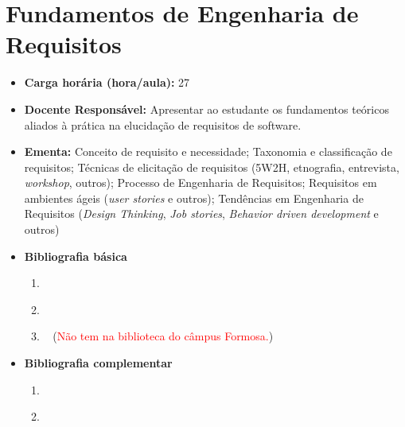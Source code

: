 \documentclass[11pt,fleqn]{book} %
\begin{document}
\newpage
\section{Fundamentos de Engenharia de Requisitos}\label{3_engreq}
\begin{itemize}
	\item \textbf{Carga horária (hora/aula):} 27
	\item \textbf{Docente Responsável:} Apresentar ao estudante os fundamentos teóricos aliados à prática na elucidação de requisitos de software.
	\item \textbf{Ementa:} 
	Conceito de requisito e necessidade;
	Taxonomia e classificação de requisitos;
	Técnicas de elicitação de requisitos (5W2H, etnografia, entrevista, \textit{workshop}, outros);
	Processo de Engenharia de Requisitos;
	Requisitos em ambientes ágeis (\textit{user stories} e outros);
	Tendências em Engenharia de Requisitos (\textit{Design Thinking}, \textit{Job stories}, \textit{Behavior driven development} e outros)
	\item \textbf{Bibliografia básica}
	\begin{enumerate}
		\item ~\cite{sommerville2011engenharia}
		\item ~\cite{pressman2016engenharia}
		\item ~\cite{prikladnicki2014metodos} (\textcolor{red}{Não tem na biblioteca do câmpus Formosa.})
	\end{enumerate}
	\item \textbf{Bibliografia complementar}
	\begin{enumerate}
		\item ~\cite{wazlawick2011analise}
		\item 
	\end{enumerate}
\end{itemize}


\newpage
\end{document}

